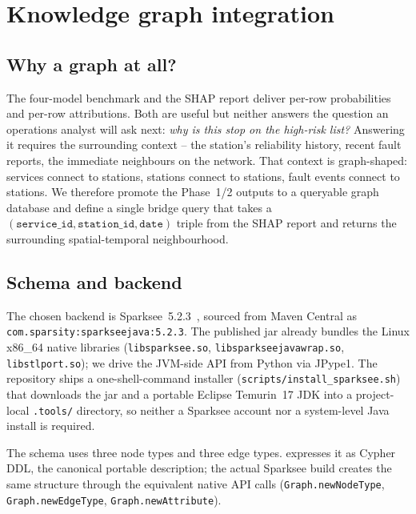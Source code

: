 \section{Knowledge graph integration}
\label{sec:kg}

\subsection{Why a graph at all?}

The four-model benchmark and the SHAP report deliver per-row probabilities and per-row attributions. Both are useful but neither answers the question an operations analyst will ask next: \emph{why is this stop on the high-risk list?} Answering it requires the surrounding context -- the station's reliability history, recent fault reports, the immediate neighbours on the network. That context is graph-shaped: services connect to stations, stations connect to stations, fault events connect to stations. We therefore promote the Phase~1/2 outputs to a queryable graph database and define a single bridge query that takes a $(\texttt{service\_id}, \texttt{station\_id}, \texttt{date})$ triple from the SHAP report and returns the surrounding spatial-temporal neighbourhood.

\subsection{Schema and backend}

The chosen backend is Sparksee~5.2.3~\cite{sparksee2024,martinez2017dex}, sourced from Maven Central as \texttt{com.sparsity:sparkseejava:5.2.3}. The published jar already bundles the Linux x86\_64 native libraries (\texttt{libsparksee.so}, \texttt{libsparkseejavawrap.so}, \texttt{libstlport.so}); we drive the JVM-side API from Python via JPype1. The repository ships a one-shell-command installer (\texttt{scripts/install\_sparksee.sh}) that downloads the jar and a portable Eclipse Temurin~17 JDK into a project-local \texttt{.tools/} directory, so neither a Sparksee account nor a system-level Java install is required.

The schema uses three node types and three edge types.  expresses it as Cypher DDL, the canonical portable description; the actual Sparksee build creates the same structure through the equivalent native API calls (\texttt{Graph.newNodeType}, \texttt{Graph.newEdgeType}, \texttt{Graph.newAttribute}).

